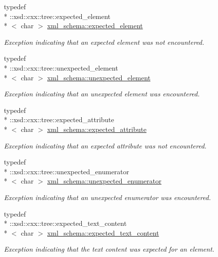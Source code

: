\begin{DoxyCompactItemize}
typedef \\*
\+::xsd\+::cxx\+::tree\+::expected\+\_\+element\\*
$<$ char $>$ \hyperlink{namespacexml__schema_a4b608c951db27c574552da0bda062e1a}{xml\+\_\+schema\+::expected\+\_\+element}
\begin{DoxyCompactList}\small\item\em Exception indicating that an expected element was not encountered. \end{DoxyCompactList}\item 
typedef \\*
\+::xsd\+::cxx\+::tree\+::unexpected\+\_\+element\\*
$<$ char $>$ \hyperlink{namespacexml__schema_a55835ab195e4c70bc05de5bbac871110}{xml\+\_\+schema\+::unexpected\+\_\+element}
\begin{DoxyCompactList}\small\item\em Exception indicating that an unexpected element was encountered. \end{DoxyCompactList}\item 
typedef \\*
\+::xsd\+::cxx\+::tree\+::expected\+\_\+attribute\\*
$<$ char $>$ \hyperlink{namespacexml__schema_ad8a9d3a09372da61ab6ba78c4de87a26}{xml\+\_\+schema\+::expected\+\_\+attribute}
\begin{DoxyCompactList}\small\item\em Exception indicating that an expected attribute was not encountered. \end{DoxyCompactList}\item 
typedef \\*
\+::xsd\+::cxx\+::tree\+::unexpected\+\_\+enumerator\\*
$<$ char $>$ \hyperlink{namespacexml__schema_aa088274f605e06cd53d9062265b5229c}{xml\+\_\+schema\+::unexpected\+\_\+enumerator}
\begin{DoxyCompactList}\small\item\em Exception indicating that an unexpected enumerator was encountered. \end{DoxyCompactList}\item 
typedef \\*
\+::xsd\+::cxx\+::tree\+::expected\+\_\+text\+\_\+content\\*
$<$ char $>$ \hyperlink{namespacexml__schema_a1994323b3f5fee8db7891f02bb9144b9}{xml\+\_\+schema\+::expected\+\_\+text\+\_\+content}
\begin{DoxyCompactList}\small\item\em Exception indicating that the text content was expected for an element. \end{DoxyCompactList}\item 

\end{DoxyCompactItemize}
